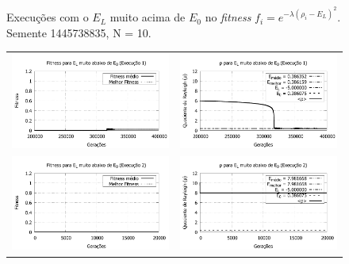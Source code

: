 \begin{figure}[htbp]
\begin{tabular}{@{}cc@{}}
		
  \end{tabular}
  \caption{Execuções com o $E_L$ muito acima de $E_0$ no \textit{fitness} $f_i = e^{-\lambda(\rho_i - E_L)^2}$. Semente 1445738835, N = 10.}
	\label{fig:variando_EL_muito_acima}
	\end{figure}
	

	\begin{figure}[htbp]
	\centering
  \begin{tabular}{@{}cc@{}}
    
			
		\includegraphics[width=.49\textwidth]{figs/resultados/variandoEL/T4E1_fitness-extendido.pdf} &
    \includegraphics[width=.49\textwidth]{figs/resultados/variandoEL/T4E1_rho_extendido.pdf}   \\

		\includegraphics[width=.49\textwidth]{figs/resultados/variandoEL/T4E2_fitness-extendido.pdf} &
    \includegraphics[width=.49\textwidth]{figs/resultados/variandoEL/T4E2_rho_extendido.pdf}   \\
		

\end{tabular}
\end{figure}
